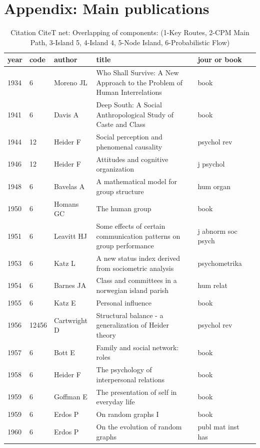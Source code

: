 \documentclass[11pt]{article} %
\newcommand{\denseFont}{\fontencoding{T1}\fontfamily{phv}\fontseries{mc}\fontshape{n}\fontsize{10}{11pt}\selectfont}
\begin{document}
\section{Appendix: Main publications}
\begin{landscape}
\LTcapwidth=220mm
\denseFont
\begin{longtable}{p{0.7cm}|p{0.8cm}|p{3cm}|p{14.5cm}|p{3.5cm}l}
\caption{Citation CiteT net: \label{compareA} Overlapping of components: (1-Key Routes, 2-CPM Main Path, 3-Island 5, 4-Island 4, 5-Node Island, 6-Probabilistic Flow)} \\
\renewcommand{\arraystretch}{0.7}
year& 	 code& 	 author& 	 title& 	jour or book\\ \hline \endhead
1934& 	6& 	 Moreno JL& 	 Who Shall Survive: A New Approach to the Problem of Human Interrelations& 	book\\
1941& 	6& 	 Davis A & 	 Deep South: A Social Anthropological Study of Caste and Class& 	book\\
1944& 	12& 	 Heider F& 	 Social perception and phenomenal causality& 	 psychol rev\\
1946& 	12& 	 Heider F& 	 Attitudes and cognitive organization& 	 j psychol\\
1948& 	6& 	 Bavelas A& 	 A mathematical model for group structure& 	 hum organ\\
1950& 	6& 	 Homans GC& 	 The human group& 	 book\\
1951& 	6& 	 Leavitt HJ& 	 Some effects of certain communication patterns on group performance& 	 j abnorm soc psych\\
1953& 	6& 	 Katz L& 	 A new status index derived from sociometric analysis& 	 psychometrika\\
1954& 	6& 	 Barnes JA& 	 Class and committees in a norwegian island parish& 	 hum relat\\
1955& 	6& 	 Katz E& 	 Personal influence& 	 book\\
1956& 	12456& 	 Cartwright D& 	 Structural balance - a generalization of Heider theory& 	 psychol rev\\
1957& 	6& 	 Bott E& 	 Family and social network: roles& 	 book\\
1958& 	6& 	 Heider F& 	 The psychology of interpersonal relations& 	 book\\
1959& 	6& 	 Goffman E& 	 The presentation of self in everyday life& 	 book\\
1959& 	6& 	 Erdos P& 	 On random graphs I& 	 book\\
1960& 	6& 	 Erdos P& 	 On the evolution of random graphs& 	 publ mat inst has\\

\end{longtable}
\end{landscape}
\end{document}
